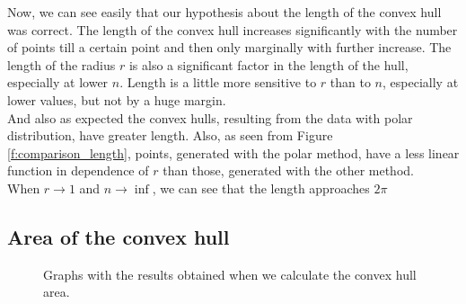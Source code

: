 \documentclass[12pt,a4paper]{article}
\begin{document}
Now, we can see easily that our hypothesis about the length of the convex hull was correct. The length of the convex hull increases significantly with the number of points till a certain point and then only marginally with further increase. The length of the radius $r$ is also a significant factor in the length of the hull, especially at lower $n$. Length is a little more sensitive to $r$ than to $n$, especially at lower values, but not by a huge margin.\\
And also as expected the convex hulls, resulting from the data with polar distribution, have greater length. Also, as seen from Figure \ref{f:comparison_length}, points, generated with the polar method, have a less linear function in dependence of $r$ than those, generated with the other method.\\
When $r\to1$ and $n\to\inf$, we can see that the length approaches $2\pi$
\pagebreak 

\subsection{Area of the convex hull}


\begin{figure}[H]
 \centering
 \caption{Graphs with the results obtained when we calculate the convex hull area.}
 \label{f:results_area}
\end{figure}
\end{document}
